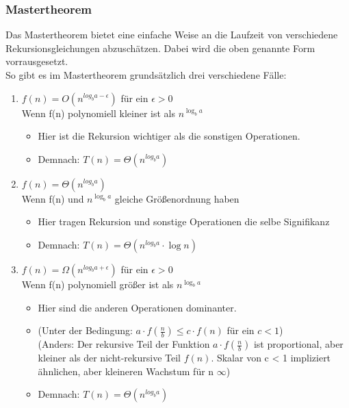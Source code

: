\documentclass[
../../AuD-Zusammenfassung.tex,
]
{subfiles}
\begin{document}
\subsubsection{Mastertheorem}
Das Mastertheorem bietet eine einfache Weise an die Laufzeit von verschiedene Rekursionsgleichungen abzuschätzen. Dabei wird die oben genannte Form vorrausgesetzt. \\
So gibt es im Mastertheorem grundsätzlich drei verschiedene Fälle:
\begin{enumerate}
    \item $f(n) = O(n^{log_b a-\epsilon})$ für ein $\epsilon > 0$\\
    Wenn f(n) polynomiell kleiner ist als $n^{\log_b a}$
    \begin{itemize}
        \item Hier ist die Rekursion wichtiger als die sonstigen Operationen. 
        \item Demnach: $T(n) = \Theta(n^{log_b a})$
    \end{itemize}
    \item $f(n) = \Theta(n^{log_b a})$\\
    Wenn f(n) und $n^{\log_b a}$ gleiche Größenordnung haben
    \begin{itemize}
        \item Hier tragen Rekursion und sonstige Operationen die selbe Signifikanz 
        \item Demnach: $T(n) = \Theta(n^{log_b a}\cdot \log n)$
    \end{itemize}
    \item $f(n) = \Omega(n^{log_b a+\epsilon})$ für ein $\epsilon > 0$\\
    Wenn f(n) polynomiell größer ist als $n^{\log_b a}$
    \begin{itemize}
        \item Hier sind die anderen Operationen dominanter.
        \item (Unter der Bedingung: $a\cdot f(\frac{n}{b})\leq c \cdot f(n)$ für ein $c < 1$)\\
        (Anders: Der rekursive Teil der Funktion $a\cdot f(\frac{n}{b})$ ist proportional, aber kleiner als der nicht-rekursive Teil $f(n)$. Skalar von c < 1 impliziert ähnlichen, aber kleineren Wachstum für n \rightarrow $\infty$)
        \item Demnach: $T(n) = \Theta(n^{log_b a})$
    \end{itemize}
\end{enumerate}
\end{document}
